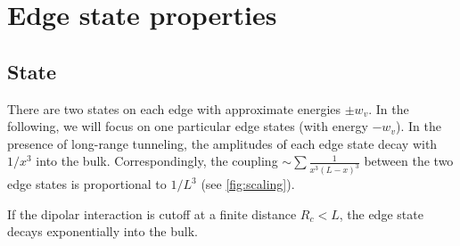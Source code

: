 \section{Edge state properties}
\subsection{State}
There are two states on each edge with approximate energies $\pm w_v$. In the following, we will focus on one particular edge states (with energy $-w_v$). In the presence of long-range tunneling,
the amplitudes of each edge state decay with $1/x^3$ into the bulk.
Correspondingly, the coupling $\sim \sum \frac{1}{x^3(L-x)^3}$ between the two edge states is proportional to $1/L^3$ (see \cref{fig:scaling}).

If the dipolar interaction is cutoff at a finite distance $R_c < L$, the edge state decays exponentially into the bulk.



